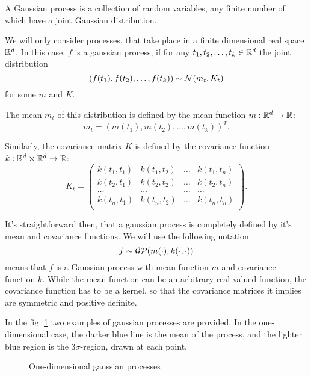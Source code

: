 A Gaussian process is a collection of random variables, any finite number of which have a joint Gaussian distribution.

We will only consider processes, that take place in a finite dimensional real space $\mathbb{R}^d$. In this case, $f$ is a gaussian process, if for any $t_1, t_2, \ldots, t_k \in \mathbb{R}^d$ the joint distribution
$$(f(t_1), f(t_2), \ldots, f(t_k)) \sim \mathcal{N}(m_t, K_t)$$
for some $m$ and $K$.

The mean $m_t$ of this distribution is defined by the mean function $m: \mathbb{R}^d \rightarrow \mathbb{R}$:
$$m_t = (m(t_1), m(t_2), \ldots, m(t_k))^T.$$

Similarly, the covariance matrix $K$ is defined by the covariance function $k: \mathbb{R}^d \times \mathbb{R}^d \rightarrow \mathbb{R}$:
$$K_t = 
\left (\begin{array}{cccc} 
k(t_1, t_1) & k(t_1, t_2) & \ldots & k(t_1, t_n) \\
k(t_2, t_1) & k(t_2, t_2) & \ldots & k(t_2, t_n) \\
\ldots & \ldots & \ldots & \ldots \\
k(t_n, t_1) & k(t_n, t_2) & \ldots & k(t_n, t_n) \\
\end{array} \right).
$$

It's straightforward then, that a gaussian process is completely defined by it's mean and covariance functions. We will use the following notation. 
$$f \sim \mathcal{GP}(m(\cdot), k(\cdot, \cdot))$$
means that $f$ is a Gaussian process with mean function $m$ and covariance function $k$. While the mean function can be an arbitrary real-valued function, the covariance function has to be a kernel, so that the covariance matrices it implies are symmetric and positive definite.

In the fig. \ref{reg_example} two examples of gaussian processes are provided. In the one-dimensional case, the darker blue line is the mean of the process, and the lighter blue region is the $3\sigma$-region, drawn at each point.


\begin{figure}[!h]
	\centering
		
	\caption{One-dimensional gaussian processes}
	\label{reg_example}
\end{figure}